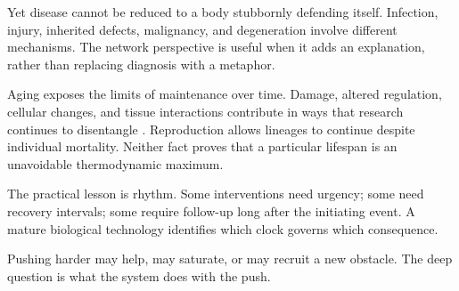 Yet disease cannot be reduced to a body stubbornly defending itself. Infection, injury, inherited defects, malignancy, and degeneration involve different mechanisms. The network perspective is useful when it adds an explanation, rather than replacing diagnosis with a metaphor.

Aging exposes the limits of maintenance over time. Damage, altered regulation, cellular changes, and tissue interactions contribute in ways that research continues to disentangle \cite{lopezotin2013hallmarks}. Reproduction allows lineages to continue despite individual mortality. Neither fact proves that a particular lifespan is an unavoidable thermodynamic maximum.

The practical lesson is rhythm. Some interventions need urgency; some need recovery intervals; some require follow-up long after the initiating event. A mature biological technology identifies which clock governs which consequence.

Pushing harder may help, may saturate, or may recruit a new obstacle. The deep question is what the system does with the push.
